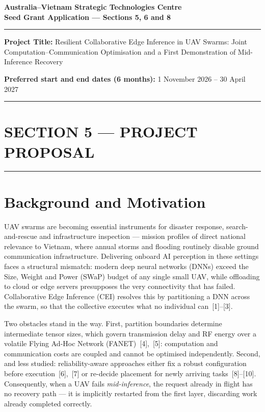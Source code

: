 \documentclass[11pt,a4paper]{article}
\newcommand{\ProjectTitle}{Resilient Collaborative Edge Inference in UAV Swarms: Joint Computation--Communication Optimisation and a First Demonstration of Mid-Inference Recovery}
\newcommand{\StartDate}{1 November 2026}
\newcommand{\EndDate}{30 April 2027}
\begin{document}
\begin{center}
  {\large\bfseries\color{avblue} Australia--Vietnam Strategic Technologies Centre}\\[2pt]
  {\normalsize\bfseries Seed Grant Application --- Sections 5, 6 and 8}\\[8pt]
  \rule{\textwidth}{0.8pt}
\end{center}

\vspace{4pt}
\noindent\textbf{Project Title:} \ProjectTitle

\vspace{4pt}
\noindent\textbf{Preferred start and end dates (6 months):} \StartDate{} -- \EndDate

\vspace{2pt}
\noindent\rule{\textwidth}{0.4pt}

\section*{\color{avblue}SECTION 5 --- PROJECT PROPOSAL}
\vspace{-4pt}\noindent\rule{\textwidth}{0.4pt}
\setcounter{section}{0}

\section{Background and Motivation}

UAV swarms are becoming essential instruments for disaster response, search-and-rescue and infrastructure inspection --- mission profiles of direct national relevance to Vietnam, where annual storms and flooding routinely disable ground communication infrastructure. Delivering onboard AI perception in these settings faces a structural mismatch: modern deep neural networks (DNNs) exceed the Size, Weight and Power (SWaP) budget of any single small UAV, while offloading to cloud or edge servers presupposes the very connectivity that has failed. Collaborative Edge Inference (CEI) resolves this by partitioning a DNN across the swarm, so that the collective executes what no individual can~[1]--[3].

Two obstacles stand in the way. First, partition boundaries determine intermediate tensor sizes, which govern transmission delay and RF energy over a volatile Flying Ad-Hoc Network (FANET)~[4],~[5]: computation and communication costs are coupled and cannot be optimised independently. Second, and less studied: reliability-aware approaches either fix a robust configuration before execution~[6],~[7] or re-decide placement for newly arriving tasks~[8]--[10]. Consequently, when a UAV fails \emph{mid-inference}, the request already in flight has no recovery path --- it is implicitly restarted from the first layer, discarding work already completed correctly.
\end{document}
